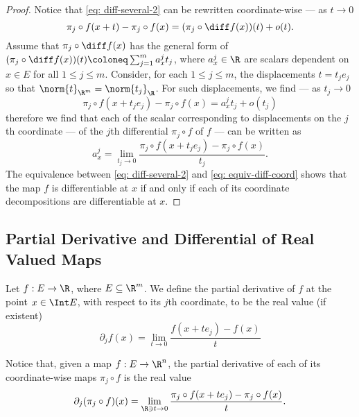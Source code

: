 \begin{proof}
  Notice that \cref{eq: diff-several-2} can be rewritten coordinate-wise --- as
  \(t \to 0\)
  \begin{equation}\label{eq: equiv-diff-coord}
    \pi_j \circ f(x + t) - \pi_j \circ f(x)
    = (\pi_j \circ \diff f(x))(t) + o(t).
  \end{equation}
  Assume that \(\pi_j \circ \diff f(x)\) has the general form of \((\pi_j \circ
  \diff f(x))(t) \coloneq \sum_{j=1}^m a_x^j t_j\), where \(a_x^j \in \R\) are scalars
  dependent on \(x \in E\) for all \(1 \leq j \leq m\). Consider, for each \(1
  \leq j \leq m\), the displacements \(t = t_j e_j\) so that \(\norm{t}_{\R^m} =
  \norm{t_j}_{\R}\). For such displacements, we find --- as \(t_j \to 0\)
  \[
    \pi_j \circ f(x + t_j e_j) - \pi_j \circ f(x) = a_x^j t_j + o(t_j)
  \]
  therefore we find that each of the scalar corresponding to displacements on
  the \(j\)th coordinate --- of the \(j\)th differential \(\pi_j \circ f\) of
  \(f\) --- can be written as
  \begin{equation}\label{eq: partial-deriv-initial}
    a_x^j = \lim_{t_j \to 0} \frac{\pi_j \circ f(x + t_j e_j) - \pi_j \circ
    f(x)} {t_j}.
  \end{equation}
  The equivalence between \cref{eq: diff-several-2} and \cref{eq:
  equiv-diff-coord} shows that the map \(f\) is differentiable at \(x\) if and
  only if each of its coordinate decompositions are differentiable at \(x\).
\end{proof}

\subsection{Partial Derivative and Differential of Real Valued Maps}

\begin{definition}\label{def: partial derivative}
  Let \(f: E \to \R\), where \(E \subseteq \R^m\). We define the partial
  derivative of \(f\) at the point \(x \in \Int E\), with respect to its \(j\)th
  coordinate, to be the real value (if existent)
  \[
    \partial_j f(x) = \lim_{t \to 0} \frac{f(x + t e_j) - f(x)}{t}
  \]
\end{definition}

Notice that, given a map \(f: E \to \R^n\), the partial derivative of each of
its coordinate-wise maps \(\pi_j \circ f\) is the real value
\[
  \partial_j (\pi_j \circ f)(x) = \lim_{\R \ni t \to 0} \frac{\pi_j \circ f(x
  + t e_j) - \pi_j \circ f(x)}{t}.
\]

